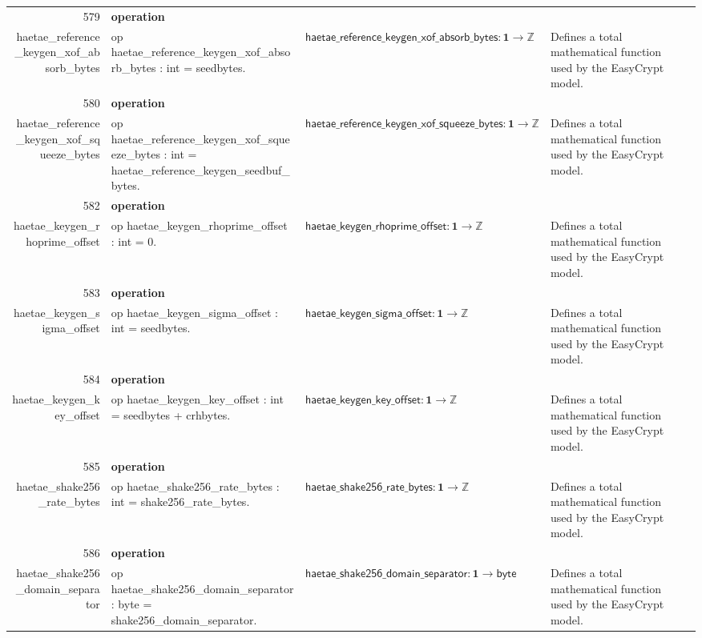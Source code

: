 \documentclass[10pt]{article}
\newcommand{\ec}[1]{\begingroup\ttfamily\scriptsize #1\endgroup}
\begin{document}
\begin{longtable}{r L{0.17\textwidth} L{0.26\textwidth} L{0.27\textwidth} L{0.20\textwidth}}
579 & \textbf{operation}\\\ec{haetae\_reference\_keygen\_xof\_absorb\_bytes} & \ec{op haetae\_reference\_keygen\_xof\_absorb\_bytes : int = seedbytes.} & \(\mathsf{haetae\_reference\_keygen\_xof\_absorb\_bytes} : \mathbf{1} \to \mathbb{Z}\) & Defines a total mathematical function used by the EasyCrypt model. \\
580 & \textbf{operation}\\\ec{haetae\_reference\_keygen\_xof\_squeeze\_bytes} & \ec{op haetae\_reference\_keygen\_xof\_squeeze\_bytes : int = haetae\_reference\_keygen\_seedbuf\_bytes.} & \(\mathsf{haetae\_reference\_keygen\_xof\_squeeze\_bytes} : \mathbf{1} \to \mathbb{Z}\) & Defines a total mathematical function used by the EasyCrypt model. \\
582 & \textbf{operation}\\\ec{haetae\_keygen\_rhoprime\_offset} & \ec{op haetae\_keygen\_rhoprime\_offset : int = 0.} & \(\mathsf{haetae\_keygen\_rhoprime\_offset} : \mathbf{1} \to \mathbb{Z}\) & Defines a total mathematical function used by the EasyCrypt model. \\
583 & \textbf{operation}\\\ec{haetae\_keygen\_sigma\_offset} & \ec{op haetae\_keygen\_sigma\_offset : int = seedbytes.} & \(\mathsf{haetae\_keygen\_sigma\_offset} : \mathbf{1} \to \mathbb{Z}\) & Defines a total mathematical function used by the EasyCrypt model. \\
584 & \textbf{operation}\\\ec{haetae\_keygen\_key\_offset} & \ec{op haetae\_keygen\_key\_offset : int = seedbytes + crhbytes.} & \(\mathsf{haetae\_keygen\_key\_offset} : \mathbf{1} \to \mathbb{Z}\) & Defines a total mathematical function used by the EasyCrypt model. \\
585 & \textbf{operation}\\\ec{haetae\_shake256\_rate\_bytes} & \ec{op haetae\_shake256\_rate\_bytes : int = shake256\_rate\_bytes.} & \(\mathsf{haetae\_shake256\_rate\_bytes} : \mathbf{1} \to \mathbb{Z}\) & Defines a total mathematical function used by the EasyCrypt model. \\
586 & \textbf{operation}\\\ec{haetae\_shake256\_domain\_separator} & \ec{op haetae\_shake256\_domain\_separator : byte = shake256\_domain\_separator.} & \(\mathsf{haetae\_shake256\_domain\_separator} : \mathbf{1} \to \mathsf{byte}\) & Defines a total mathematical function used by the EasyCrypt model. \\

\end{longtable}
\end{document}
